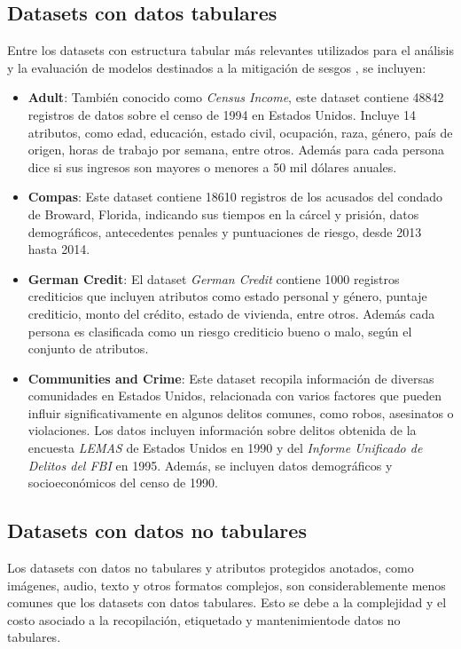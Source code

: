    \subsection{Datasets con datos tabulares}
    Entre los datasets con estructura tabular m\'as relevantes utilizados para el an\'alisis y la evaluaci\'on de modelos destinados 
    a la mitigaci\'on de sesgos \parencite{calmon2017optimized,wang2023mitigating,compas}, se incluyen:
    \begin{itemize}
        \item \textbf{Adult}: Tambi\'en conocido como \textit{Census Income}, este dataset contiene 48842 registros de 
        datos sobre el censo de 1994 en Estados Unidos. Incluye 14 atributos, como edad, educaci\'on, estado civil,
        ocupaci\'on, raza, g\'enero, pa\'is de origen, horas de trabajo por semana, entre otros. Adem\'as para cada 
        persona dice si sus ingresos son mayores o menores a 50 mil d\'olares anuales.
        \item \textbf{Compas}: Este dataset contiene 18610 registros de los acusados del condado de Broward, Florida,
        indicando sus tiempos en la c\'arcel y prisi\'on, datos demogr\'aficos, antecedentes penales y puntuaciones 
        de riesgo, desde 2013 hasta 2014.
        \item \textbf{German Credit}: El dataset \textit{German Credit} contiene 1000 registros crediticios que incluyen atributos 
        como estado personal y g\'enero, puntaje crediticio, monto del cr\'edito, estado de vivienda, entre otros. Adem\'as cada 
        persona es clasificada como un riesgo crediticio bueno o malo, seg\'un el conjunto de atributos.
        \item \textbf{Communities and Crime}: Este dataset recopila informaci\'on de diversas comunidades en Estados Unidos, 
        relacionada con varios factores que pueden influir significativamente en algunos delitos comunes, como robos, asesinatos o 
        violaciones. Los datos incluyen informaci\'on sobre delitos obtenida de la encuesta \textit{LEMAS} de Estados Unidos en 1990 y 
        del \textit{Informe Unificado de Delitos del FBI} en 1995. Adem\'as, se incluyen datos demogr\'aficos y socioecon\'omicos del 
        censo de 1990.

    \end{itemize}

    \subsection{Datasets con datos no tabulares}
    Los datasets con datos no tabulares y atributos protegidos anotados, como im\'agenes, audio, texto y otros formatos complejos, 
    son considerablemente menos comunes que los datasets con datos tabulares. Esto se debe a la complejidad y el costo asociado a la 
    recopilaci\'on, etiquetado y mantenimientode datos no tabulares.

